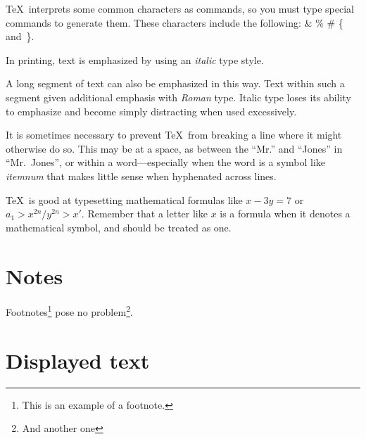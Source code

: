 \documentclass[book, 12pt]{phd}
\begin{document}
\TeX\ interprets some common characters as commands, so you must type
special commands to generate them.  These characters include the
following:
        \& \% \# \{ and~\}.

In printing, text is emphasized by using an
       {\em italic\/}  %
type style.

   A long segment of text can also be emphasized in this way.  Text within
   such a segment given additional emphasis
      with\/ {\em Roman}
   type.  Italic type loses its ability to emphasize and become simply
   distracting when used excessively.




It is sometimes necessary to prevent \TeX\ from breaking a line where
it might otherwise do so.  This may be at a space, as between the
``Mr.'' and ``Jones'' in
       ``Mr.~Jones'',        %
or within a word---especially when the word is a symbol like
       \mbox{\em itemnum\/}
that makes little sense when hyphenated across
       lines.

\TeX\ is good at typesetting mathematical formulas like
       \( x-3y = 7 \)
or
       \( a_{1} > x^{2n} / y^{2n} > x' \).
Remember that a letter like
       $x$        %
is a formula when it denotes a mathematical symbol, and should
be treated as one.


\section{Notes}
Footnotes\footnote{This is an example of a footnote.}
pose no problem\footnote{And another one}.

\section{Displayed text}
\end{document}
